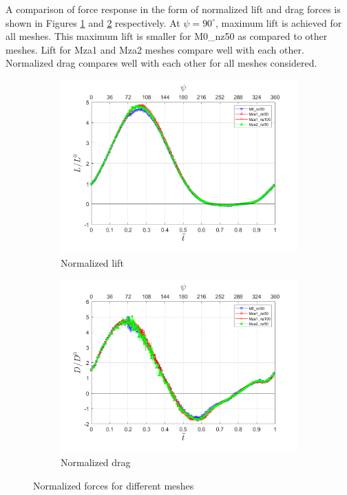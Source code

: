 
A comparison of force response in the form of normalized lift and drag forces is shown in Figures \ref{fig:lift_zonal_adapt_Re200k} and \ref{fig:drag_zonal_adapt_Re200k} respectively. 
At $\psi=90^\circ$, maximum lift is achieved for all meshes.
This maximum lift is smaller for M0\_nz50 as compared to other meshes. 
Lift for Mza1 and Mza2 meshes compare well with each other.
Normalized drag compares well with each other for all meshes considered.

\begin{figure}[H]
	\centering
	
	\begin{subfigure}[b]{0.7\textwidth}
		\centering
		\includegraphics[width=1\textwidth]{figures/zonal_adapt_results/force_response_Re200k/Lift_inst.png}
		\caption{Normalized lift}
		\label{fig:lift_zonal_adapt_Re200k}
	\end{subfigure}
	\begin{subfigure}[b]{0.7\textwidth}
		\centering
		\includegraphics[width=1\textwidth]{figures/zonal_adapt_results/force_response_Re200k/Drag_inst.png}
		\caption{Normalized drag}
		\label{fig:drag_zonal_adapt_Re200k}
	\end{subfigure}
	
	\label{fig:force_response_zonal_adapt_Re200k}
	\caption{Normalized forces for different meshes}
\end{figure}